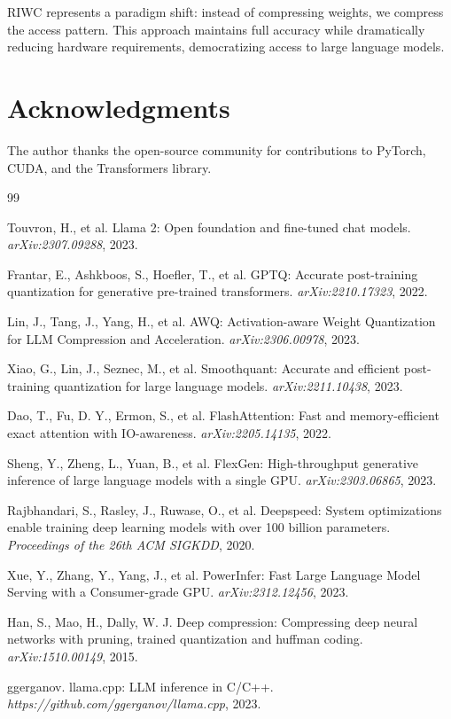 \documentclass[twocolumn,10pt]{article}
\begin{document}
RIWC represents a paradigm shift: instead of compressing weights, we compress the access pattern. This approach maintains full accuracy while dramatically reducing hardware requirements, democratizing access to large language models.

\section*{Acknowledgments}

The author thanks the open-source community for contributions to PyTorch, CUDA, and the Transformers library.

\begin{thebibliography}{99}

Touvron, H., et al.
\newblock Llama 2: Open foundation and fine-tuned chat models.
\newblock \textit{arXiv:2307.09288}, 2023.

Frantar, E., Ashkboos, S., Hoefler, T., et al.
\newblock GPTQ: Accurate post-training quantization for generative pre-trained transformers.
\newblock \textit{arXiv:2210.17323}, 2022.

Lin, J., Tang, J., Yang, H., et al.
\newblock AWQ: Activation-aware Weight Quantization for LLM Compression and Acceleration.
\newblock \textit{arXiv:2306.00978}, 2023.

Xiao, G., Lin, J., Seznec, M., et al.
\newblock Smoothquant: Accurate and efficient post-training quantization for large language models.
\newblock \textit{arXiv:2211.10438}, 2023.

Dao, T., Fu, D. Y., Ermon, S., et al.
\newblock FlashAttention: Fast and memory-efficient exact attention with IO-awareness.
\newblock \textit{arXiv:2205.14135}, 2022.

Sheng, Y., Zheng, L., Yuan, B., et al.
\newblock FlexGen: High-throughput generative inference of large language models with a single GPU.
\newblock \textit{arXiv:2303.06865}, 2023.

Rajbhandari, S., Rasley, J., Ruwase, O., et al.
\newblock Deepspeed: System optimizations enable training deep learning models with over 100 billion parameters.
\newblock \textit{Proceedings of the 26th ACM SIGKDD}, 2020.

Xue, Y., Zhang, Y., Yang, J., et al.
\newblock PowerInfer: Fast Large Language Model Serving with a Consumer-grade GPU.
\newblock \textit{arXiv:2312.12456}, 2023.

Han, S., Mao, H., Dally, W. J.
\newblock Deep compression: Compressing deep neural networks with pruning, trained quantization and huffman coding.
\newblock \textit{arXiv:1510.00149}, 2015.

ggerganov.
\newblock llama.cpp: LLM inference in C/C++.
\newblock \textit{https://github.com/ggerganov/llama.cpp}, 2023.

\end{thebibliography}
\end{document}
